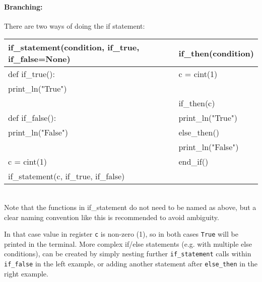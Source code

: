 \paragraph{Branching:}
There are two ways of doing the if statement: 
\begin{center}
\begin{tabular}{|l|l|} \hline
\textbf{if_statement(condition, if_true, if_false=None)} & \textbf{if_then(condition)} \\ \hline
def if_true():                                           & c = cint(1)                 \\
\hspace{5 mm}print_ln("True")                            &                             \\
                                                         & if_then(c)                  \\
def if_false():                                          & print_ln("True")            \\
\hspace{5 mm}print_ln("False")                           & else_then()                 \\
                                                         & print_ln("False")           \\
c = cint(1)                                              & end_if()                    \\
if_statement(c, if_true, if_false)                       &                             \\ \hline
\end{tabular}
\begin{footnotesize}
\\ Note that the functions in if_statement do not need to be named as above, but a clear naming convention like this is recommended to avoid ambiguity.
\end{footnotesize}
\end{center}
In that case value in register \verb|c| is non-zero (1), so in both cases \verb|True| will be printed in the terminal. More complex if/else statements (e.g. with multiple else conditions), can be created by simply nesting further \verb|if_statement| calls within \verb|if_false| in the left example, or adding another statement after \verb|else_then| in the right example. \\

